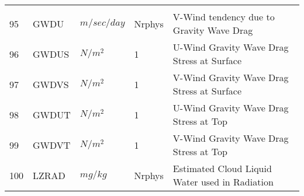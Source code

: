\begin{tabular}{lllll}
\begin{minipage}[t]{3in}
         \end{minipage}\\
95 & GWDU     &    $m/sec/day$ &  Nrphys
         &\begin{minipage}[t]{3in}
          {V-Wind tendency due to Gravity Wave Drag}
         \end{minipage}\\
96 & GWDUS    &    $N/m^2$ &  1
         &\begin{minipage}[t]{3in}
          {U-Wind Gravity Wave Drag Stress at Surface}
         \end{minipage}\\
97 & GWDVS    &    $N/m^2$ &  1
         &\begin{minipage}[t]{3in}
          {V-Wind Gravity Wave Drag Stress at Surface}
         \end{minipage}\\
98 & GWDUT    &    $N/m^2$ &  1
         &\begin{minipage}[t]{3in}
          {U-Wind Gravity Wave Drag Stress at Top}
         \end{minipage}\\
99 & GWDVT    &    $N/m^2$ &  1
         &\begin{minipage}[t]{3in}
          {V-Wind Gravity Wave Drag Stress at Top}
         \end{minipage}\\
100& LZRAD    &    $mg/kg$ &  Nrphys
         &\begin{minipage}[t]{3in}
          {Estimated Cloud Liquid Water used in Radiation}
         \end{minipage}\\
\end{tabular}
\vfill

